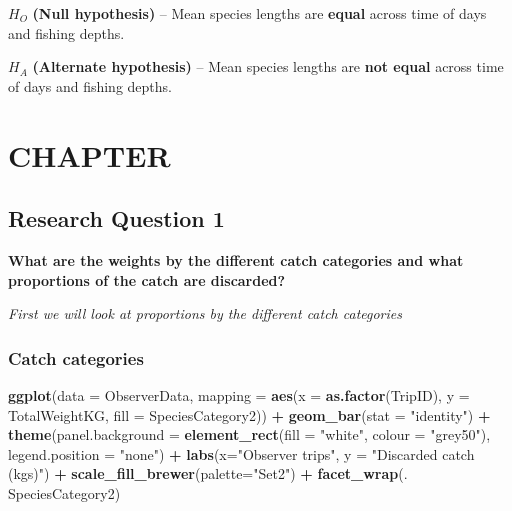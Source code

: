 \documentclass[
]{book}
\newenvironment{Shaded}{\begin{snugshade}}{\end{snugshade}}
\newcommand{\DataTypeTok}[1]{\textcolor[rgb]{0.13,0.29,0.53}{#1}}
\newcommand{\KeywordTok}[1]{\textcolor[rgb]{0.13,0.29,0.53}{\textbf{#1}}}
\newcommand{\NormalTok}[1]{#1}
\newcommand{\OperatorTok}[1]{\textcolor[rgb]{0.81,0.36,0.00}{\textbf{#1}}}
\newcommand{\StringTok}[1]{\textcolor[rgb]{0.31,0.60,0.02}{#1}}
\begin{document}
\(H_O\) \textbf{(Null hypothesis)} -- Mean species lengths are \textbf{equal} across time of days and fishing depths.

\(H_A\) \textbf{(Alternate hypothesis)} -- Mean species lengths are \textbf{not equal} across time of days and fishing depths.

\hypertarget{chapter-1}{%
\chapter{CHAPTER}\label{chapter-1}}

\hypertarget{research-question-1}{%
\section{Research Question 1}\label{research-question-1}}

\textbf{What are the weights by the different catch categories and what proportions of the catch are discarded?}

\emph{First we will look at proportions by the different catch categories}

\hypertarget{catch-categories}{%
\subsection{Catch categories}\label{catch-categories}}

\begin{Shaded}
\begin{Highlighting}[]
\KeywordTok{ggplot}\NormalTok{(}\DataTypeTok{data =}\NormalTok{ ObserverData,}
  \DataTypeTok{mapping =} \KeywordTok{aes}\NormalTok{(}\DataTypeTok{x =} \KeywordTok{as.factor}\NormalTok{(TripID),}
    \DataTypeTok{y =}\NormalTok{ TotalWeightKG, }
    \DataTypeTok{fill =}\NormalTok{ SpeciesCategory2)) }\OperatorTok{+}
\StringTok{  }\KeywordTok{geom_bar}\NormalTok{(}\DataTypeTok{stat =} \StringTok{"identity"}\NormalTok{) }\OperatorTok{+}
\StringTok{  }\KeywordTok{theme}\NormalTok{(}\DataTypeTok{panel.background =} \KeywordTok{element_rect}\NormalTok{(}\DataTypeTok{fill =} \StringTok{"white"}\NormalTok{,}
    \DataTypeTok{colour =} \StringTok{"grey50"}\NormalTok{),}
    \DataTypeTok{legend.position =} \StringTok{"none"}\NormalTok{) }\OperatorTok{+}
\StringTok{  }\KeywordTok{labs}\NormalTok{(}\DataTypeTok{x=}\StringTok{"Observer trips"}\NormalTok{, }
    \DataTypeTok{y =} \StringTok{"Discarded catch (kgs)"}\NormalTok{) }\OperatorTok{+}\StringTok{ }
\StringTok{  }\KeywordTok{scale_fill_brewer}\NormalTok{(}\DataTypeTok{palette=}\StringTok{"Set2"}\NormalTok{) }\OperatorTok{+}\StringTok{  }
\StringTok{  }\KeywordTok{facet_wrap}\NormalTok{(. }\OperatorTok{~}\StringTok{ }\NormalTok{SpeciesCategory2)}
\end{Highlighting}
\end{Shaded}
\end{document}
